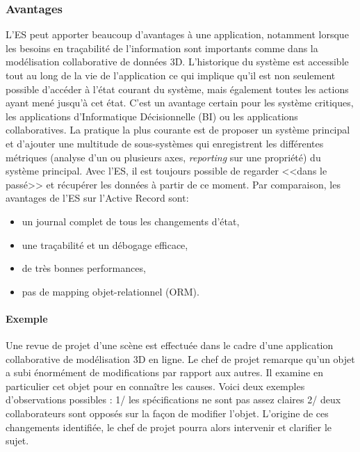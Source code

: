 	\subsubsection{Avantages}
	L'\gls{ES} peut apporter beaucoup d'avantages à une application, notamment 
	lorsque les besoins en traçabilité de l'information sont importants comme dans 
	la modélisation collaborative de données 3D.
	L'historique du système est accessible tout au long de la vie de l'application ce 
	qui implique qu'il est non seulement possible d'accéder à l'état courant du 
	système, mais également toutes les actions ayant mené jusqu'à cet état. C'est 
	un avantage certain pour les système critiques, les applications d'Informatique 
	Décisionnelle (\gls{BI}) ou les applications collaboratives. La pratique la plus 
	courante est de proposer un système principal et d'ajouter une multitude de 
	sous-systèmes qui enregistrent les différentes métriques (analyse d'un ou 
	plusieurs axes, \textit{reporting} sur une propriété) du système principal. Avec 
	l'\gls{ES}, il est toujours possible de regarder <<dans le passé>> et récupérer 
	les données à partir de ce moment. Par comparaison, les avantages de 
	l'\gls{ES} sur l'Active Record sont:
	\begin{itemize}
		\item un journal complet de tous les changements d'état,
		\item une traçabilité et un débogage efficace,
		\item de très bonnes performances,
		\item pas de mapping objet-relationnel (ORM).
	\end{itemize}
	
	
	\paragraph{Exemple} 
	Une revue de projet d'une scène est effectuée dans le cadre d'une application 
	collaborative de modélisation 3D en ligne. Le chef de projet remarque qu'un 
	objet a subi énormément de modifications par rapport aux autres. Il examine en 
	particulier cet objet pour en connaître les causes. Voici deux exemples 
	d'observations possibles : 1/ les spécifications ne sont pas assez claires 2/ 
	deux collaborateurs sont opposés sur la façon de modifier l'objet. L'origine de 
	ces changements identifiée, le chef de projet pourra alors intervenir et clarifier 
	le sujet. 
	
